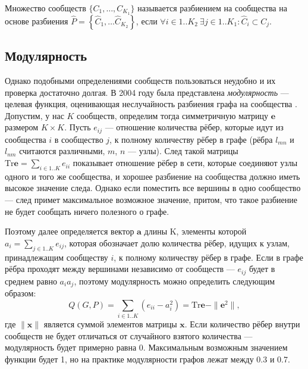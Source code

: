 Множество сообществ $\{C_1, \dots, C_{K_1}\}$ называется разбиением на сообщества на основе разбиения $\hat{P} = \left\{\hat{C}_1, \dots \hat{C}_{K_2}\right\}$, если $\forall i \in 1..K_2\ \exists j \in 1..K_1: \hat{C}_i \subset C_j$.



\subsection{Модулярность}

Однако подобными определениями сообществ пользоваться неудобно и их проверка достаточно долгая. В 2004 году была представлена \emph{модулярность} --- целевая функция, оценивающая неслучайность разбиения графа на сообщества \cite{Newman&Girvan:2004}. Допустим, у нас $K$ сообществ, определим тогда симметричную матрицу $\mathbf{e}$ размером $K \times K$. Пусть $e_{ij}$ --- отношение количества рёбер, которые идут из сообщества $i$ в сообщество $j$, к полному количеству рёбер в графе (рёбра $l_{mn}$ и $l_{nm}$ считаются различными, $m$, $n$ --- узлы). След такой матрицы $\mathrm{Tr} \mathbf{e} = \sum_{i \in 1..K}{e_{ii}}$ показывает отношение рёбер в сети, которые соединяют узлы одного и того же сообщества, и хорошее разбиение на сообщества должно иметь высокое значение следа. Однако если поместить все вершины в одно сообщество --- след примет максимальное возможное значение, притом, что такое разбиение не будет сообщать ничего полезного о графе.

Поэтому далее определяется вектор $\mathbf{a}$ длины K, элементы которой $a_i = \sum_{j \in 1..K}{e_{ij}}$, которая обозначает долю количества рёбер, идущих к узлам, принадлежащим сообществу $i$, к полному количеству рёбер в графе. Если в графе рёбра проходят между вершинами независимо от сообществ --- $e_{ij}$ будет в среднем равно $a_i a_j$, поэтому модулярность можно определить следующим образом:
\begin{equation} \label{eq:q1}
Q(G, P) = \sum_{i \in 1..K}{\left(e_{ii} - a_i^2\right)} = \mathrm{Tr} \mathbf{e} - \|\mathbf{e}^2\|,
\end{equation}
где $\|\mathbf{x}\|$ является суммой элементов матрицы $\mathbf{x}$. Если количество рёбер внутри сообществ не будет отличаться от случайного взятого количества --- модулярность будет примерно равна 0. Максимальным возможным значением функции будет 1, но на практике модулярности графов лежат между 0.3 и 0.7.

